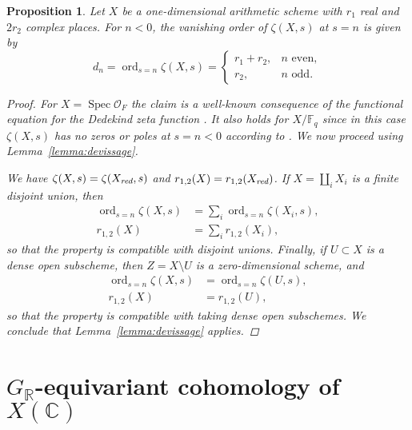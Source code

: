 \documentclass{article}
\DeclareMathOperator{\ord}{ord}
\DeclareMathOperator{\Spec}{Spec}
\newcommand{\CC}{\mathbb{C}}
\newcommand{\FF}{\mathbb{F}}
\newcommand{\RR}{\mathbb{R}}
\newcommand{\red}{\text{\it red}}
\theoremstyle{myplain}
\newtheorem{proposition}[theorem]{Proposition}
\theoremstyle{mydefinition}
\begin{document}
\begin{proposition}
  \label{prop:vanishing-order-equals-dn}
  Let $X$ be a one-dimensional arithmetic scheme with $r_1$ real and $2r_2$
  complex places. For $n < 0$, the vanishing order of $\zeta (X,s)$ at $s = n$
  is given by
  \begin{equation}
    \label{eqn:dn}
    d_n = \ord_{s = n} \zeta (X,s) =
    \begin{cases}
      r_1 + r_2, & n\text{ even}, \\
      r_2, & n\text{ odd}.
    \end{cases}
  \end{equation}

  \begin{proof}
    For $X = \Spec \mathcal{O}_F$ the claim is a well-known consequence of the
    functional equation for the Dedekind zeta function
    \cite[\S VII.5]{Neukirch-1999}. It also holds for $X/\FF_q$ since in this
    case $\zeta (X,s)$ has no zeros or poles at $s = n < 0$ according to
    \cite[pp.\,26--27]{Katz-1994}. We now proceed using
    Lemma~\ref{lemma:devissage}.

    We have $\zeta (X,s) = \zeta (X_\red,s)$ and
    $r_{1,2} (X) = r_{1,2} (X_\red)$.
    If $X = \coprod_i X_i$ is a finite disjoint union, then
    \begin{align*}
      \ord_{s = n} \zeta (X,s) & = \sum_i \ord_{s = n} \zeta (X_i,s), \\
      r_{1,2} (X) & = \sum_i r_{1,2} (X_i),
    \end{align*}
    so that the property is compatible with disjoint unions. Finally, if
    $U \subset X$ is a dense open subscheme, then $Z = X\setminus U$ is a
    zero-dimensional scheme, and
    \begin{align*}
      \ord_{s = n} \zeta (X,s) & = \ord_{s = n} \zeta (U,s), \\
      r_{1,2} (X) & = r_{1,2} (U),
    \end{align*}
    so that the property is compatible with taking dense open subschemes.
    We conclude that Lemma~\ref{lemma:devissage} applies.
  \end{proof}
\end{proposition}


\section{$G_\RR$-equivariant cohomology of $X(\CC)$}
\label{sec:GR-equivariant-cohomology}
\end{document}

